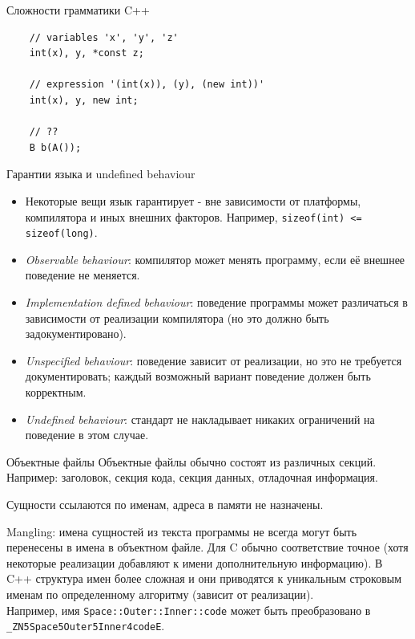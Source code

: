 \documentclass[unknownkeysallowed,xcolor=table]{beamer}
\begin{document}
\begin{frame}[fragile]{Сложности грамматики C++}
  \begin{lstlisting}
    // variables 'x', 'y', 'z'
    int(x), y, *const z;

    // expression '(int(x)), (y), (new int))'
    int(x), y, new int;

    // ??
    B b(A());
  \end{lstlisting}
\end{frame}

\begin{frame}{Гарантии языка и undefined behaviour}
\begin{itemize}
  \item Некоторые вещи язык гарантирует - вне зависимости от платформы, компилятора и иных внешних факторов. Например, \lstinline{sizeof(int) <= sizeof(long)}.
  \item \emph{Observable behaviour}: компилятор может менять программу, если её внешнее поведение не меняется.
  \item \emph{Implementation defined behaviour}: поведение программы может различаться в зависимости от реализации компилятора (но это должно быть задокументировано).
  \item \emph{Unspecified behaviour}: поведение зависит от реализации, но это не требуется документировать; каждый возможный вариант поведение должен быть корректным.
  \item \emph{Undefined behaviour}: стандарт не накладывает никаких ограничений на поведение в этом случае.
\end{itemize}
\end{frame}

\begin{frame}{Объектные файлы}
Объектные файлы обычно состоят из различных секций. Например: заголовок, секция кода, секция данных, отладочная информация.

Сущности ссылаются по именам, адреса в памяти не назначены.

Mangling: имена сущностей из текста программы не всегда могут быть перенесены в имена в объектном файле. Для C обычно соответствие точное (хотя некоторые реализации добавляют к имени дополнительную информацию). В C++ структура имен более сложная и они приводятся к уникальным строковым именам по определенному алгоритму (зависит от реализации).\\
Например, имя \lstinline{Space::Outer::Inner::code} может быть преобразовано в \lstinline{_ZN5Space5Outer5Inner4codeE}.
\end{frame}
\end{document}
